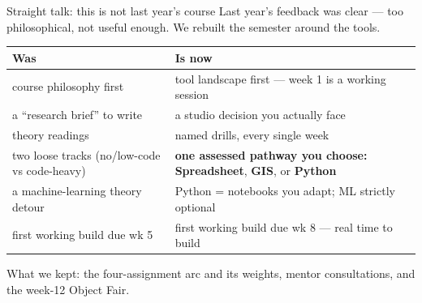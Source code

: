 \documentclass[aspectratio=169,10pt]{beamer}
\newcommand{\muted}[1]{{\color{cMute}#1}}
\begin{document}
\begin{frame}{Straight talk: this is not last year's course}
  Last year's feedback was clear --- too philosophical, not useful enough.
  We rebuilt the semester around the tools.
  \vspace{1.5mm}

  \footnotesize
  \begin{tabular}{@{}p{}@{\hspace{6mm}}p{}@{}}
    \muted{\textbf{Was}} & \textbf{Is now}\\
    \midrule
    course philosophy first & tool landscape first --- week 1 is a working session\\
    a ``research brief'' to write & a studio decision you actually face\\
    theory readings & named drills, every single week\\
    two loose tracks (no/low-code vs code-heavy) & \textbf{one assessed pathway you choose:} \textcolor{cSheet}{\textbf{Spreadsheet}}, \textcolor{cGIS}{\textbf{GIS}}, or \textcolor{cPy}{\textbf{Python}}\\
    a machine-learning theory detour & Python = notebooks you adapt; ML strictly optional\\
    first working build due wk 5 & first working build due wk 8 --- real time to build\\
  \end{tabular}

  \vspace{2.5mm}
  \small
  What we kept: the four-assignment arc and its weights, mentor
  consultations, and the week-12 \alert{Object Fair}.
\end{frame}
\end{document}
